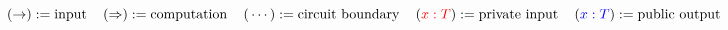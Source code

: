\documentclass{article}
\begin{document}
\begin{center}
\begin{tikzcd}
\end{tikzcd}
\end{center}

\begin{center}
\begin{tikzcd}
\end{tikzcd}
\end{center}

\vspace{2em}

\[
    (\rightarrow) := \text{input}
    \,\,\,\,\,\,\,
    (\Rightarrow) := \text{computation}
    \,\,\,\,\,\,\,
    (\,\cdots\,) := \text{circuit boundary}
    \,\,\,\,\,\,\,
    ({\color{red}{x : T}}) := \text{private input}
    \,\,\,\,\,\,\,
    ({\color{blue}{x : T}}) := \text{public output}
\]
\end{document}
